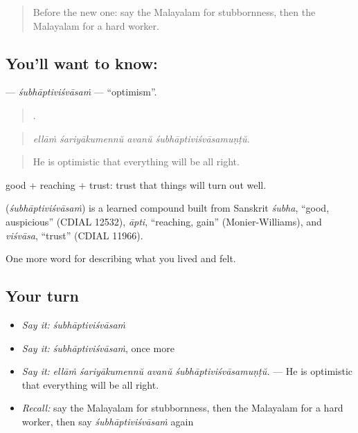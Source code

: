 \label{lesson:ML-C528-subhaptivisvasam}



\begin{quote}
Before the new one: say the Malayalam for stubbornness, then the Malayalam for a hard worker.
\end{quote}

\subsection*{You'll want to know: }
\textbf{} — \emph{śubhāptiviśvāsaṁ} — \textquotedblleft{}optimism\textquotedblright{}.

\begin{quote}
   .
\end{quote}

\begin{quote}
\emph{ellāṁ śariyākumennŭ avanŭ śubhāptiviśvāsamuṇṭŭ.}
\end{quote}

\begin{quote}
He is optimistic that everything will be all right.
\end{quote}

 good +  reaching +  trust: trust that things will turn out well.

\begin{cousinweb}
\textbf{} (\emph{śubhāptiviśvāsaṁ}) is a learned compound built from Sanskrit \emph{śubha}, \textquotedblleft{}good, auspicious\textquotedblright{} (CDIAL 12532), \emph{āpti}, \textquotedblleft{}reaching, gain\textquotedblright{} (Monier-Williams), and \emph{viśvāsa}, \textquotedblleft{}trust\textquotedblright{} (CDIAL 11966).
\end{cousinweb}

\begin{grammarlens}[title={What you've built}]
One more word for describing what you lived and felt.
\end{grammarlens}

\subsection*{Your turn}
\begin{itemize}
\raggedright
  \item \emph{Say it:} \emph{śubhāptiviśvāsaṁ}
  \item \emph{Say it:} \emph{śubhāptiviśvāsaṁ}, once more
  \item \emph{Say it:} \emph{ellāṁ śariyākumennŭ avanŭ śubhāptiviśvāsamuṇṭŭ.} — He is optimistic that everything will be all right.
  \item \emph{Recall:} say the Malayalam for stubbornness, then the Malayalam for a hard worker, then say \emph{śubhāptiviśvāsaṁ} again
\end{itemize}

